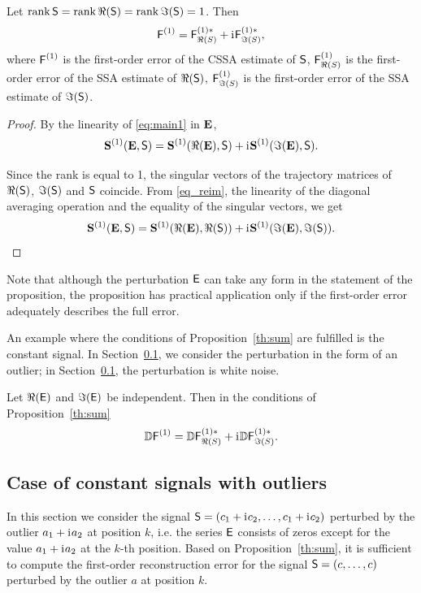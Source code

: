 \documentclass[engproc, submit, article,pdftex,moreauthors]{Definitions/mdpi}
\DeclareMathOperator\rank{rank}
\newcommand{\iu}{\mathrm{i}\mkern1mu}
\begin{document}
\begin{Proposition}\label{th:sum}
	Let $\rank \tS = \rank \Re(\tS) = \rank \Im(\tS) = 1$. Then $$\tF^{(1)} = \tF^{(1)*}_{\Re(S)} + \iu \tF^{(1)*}_{\Im(S)},$$
where $\textsf{F}^{(1)}$ is the first-order error of the CSSA estimate of $\textsf{S}$, $\textsf{F}^{(1)}_{\Re(S)}$ is the first-order error of the SSA estimate of $\Re(\textsf{S})$, $\textsf{F}^{(1)}_{\Im(S)}$ is the first-order error of the SSA estimate of $\Im(\textsf{S})$.
\end{Proposition}
\begin{proof}
By the linearity of \eqref{eq:main1} in $\mathbf{E}$,
\begin{equation} \label{eq_reim}
		\bfS^{(1)}(\mathbf{E}, \tS) = \bfS^{(1)}(\Re(\mathbf{E}), \tS) + \iu\bfS^{(1)}(\Im(\mathbf{E}), \tS).
\end{equation}

Since the rank is equal to 1, the singular vectors of the trajectory matrices of $\Re(\textsf{S})$, $\Im(\textsf{S})$ and $\textsf{S}$ coincide.
From \eqref{eq_reim}, the linearity of the diagonal averaging operation and the equality of the singular vectors, we get
\begin{equation} \label{eq_reim}
		\bfS^{(1)}(\mathbf{E}, \tS) = \bfS^{(1)}(\Re(\mathbf{E}), \Re(\tS)) + \iu\bfS^{(1)}(\Im(\mathbf{E}), \Im(\tS)).
\end{equation}
\end{proof}

Note that although the perturbation $\textsf{E}$ can take any form in the statement of the proposition, the proposition has practical application only if the first-order error adequately describes the full error.

An example where the conditions of Proposition~\ref{th:sum} are fulfilled is the constant signal. In Section~\ref{sec:outlier}, we consider the perturbation in the form of an outlier; in Section~\ref{sec:outlier}, the perturbation is white noise. 

\begin{Corollary}
Let $\Re(\textsf{E})$ and $\Im(\textsf{E})$ be independent. Then in the conditions of Proposition~\ref{th:sum}
$$\mathbb{D} \tF^{(1)} = \mathbb{D}\tF^{(1)*}_{\Re(S)} + \iu \mathbb{D}\tF^{(1)*}_{\Im(S)}.$$
\end{Corollary}

\subsection{Case of constant signals with outliers}
\label{sec:outlier}
In this section we consider the signal $\tS = (c_1 + \iu c_2, \ldots, c_1 + \iu c_2)$ perturbed by the outlier $a_1 + \iu a_2$ at position $k$, i.e. the series $\textsf{E}$ consists of zeros except for the value $a_1 + \iu a_2$ at the $k$-th position. Based on Proposition~\ref{th:sum}, it is sufficient to compute the first-order reconstruction error for the signal $\textsf{S} = (c, \ldots, c)$ perturbed by the outlier $a$ at position $k$.
\end{document}
